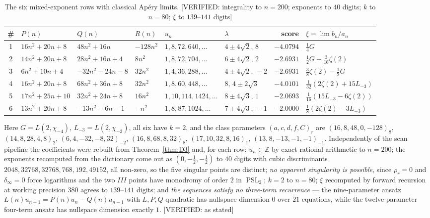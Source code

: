 \documentclass[11pt,reqno]{amsart}
\theoremstyle{plain}
\theoremstyle{definition}
\theoremstyle{remark}
\theoremstyle{plain}
\newcommand{\Z}{\mathbb{Z}}
\DeclareMathOperator{\PSL}{PSL}
\newcommand{\Verified}[1]{\textup{\textsf{[VERIFIED: #1]}}}
\begin{document}
\begin{table}[htbp]\centering\footnotesize
\setlength{\tabcolsep}{4pt}
\caption{The six mixed-exponent rows with classical Ap\'ery limits.
\Verified{integrality to $n=200$; exponents to $40$ digits; $k$ to $n=80$;
$\xi$ to $139$--$141$ digits}}\label{tab:six}
\begin{tabular}{clllllrl}
\toprule
\# & $P(n)$ & $Q(n)$ & $R(n)$ & $u_n$ & $\lambda$ & score & $\xi=\lim b_n/a_n$\\
\midrule
1 & $16n^2{+}20n{+}8$ & $48n^2{+}16n$ & $-128n^2$ & $1,8,72,640,\dots$ & $4{\pm}4\sqrt2,\,8$ & $-4.0794$ & $\tfrac14G$\\
2 & $14n^2{+}20n{+}8$ & $28n^2{+}16n{+}4$ & $8n^2$ & $1,8,72,704,\dots$ & $6{\pm}4\sqrt2,\,2$ & $-2.6931$ & $\tfrac12G-\tfrac3{16}\zeta(2)$\\
3 & $6n^2{+}10n{+}4$ & $-32n^2{-}24n{-}8$ & $32n^2$ & $1,4,36,288,\dots$ & $4{\pm}4\sqrt2,\,-2$ & $-2.6931$ & $\tfrac38\zeta(2)-\tfrac12G$\\
4 & $16n^2{+}20n{+}8$ & $68n^2{+}36n{+}8$ & $32n^2$ & $1,8,60,448,\dots$ & $8,\,4{\pm}2\sqrt3$ & $-4.0101$ & $\tfrac1{32}(2\zeta(2)+15L_{-3})$\\
5 & $17n^2{+}25n{+}10$ & $32n^2{+}24n{+}8$ & $16n^2$ & $1,10,114,1424,\dots$ & $8{\pm}4\sqrt3,\,1$ & $-2.0693$ & $\tfrac1{16}(15L_{-3}-6\zeta(2))$\\
6 & $13n^2{+}20n{+}8$ & $-13n^2{-}6n{-}1$ & $-n^2$ & $1,8,87,1024,\dots$ & $7{\pm}4\sqrt3,\,-1$ & $-2.0000$ & $\tfrac18(2\zeta(2)-3L_{-3})$\\
\bottomrule
\end{tabular}
\end{table}

Here $G=L(2,\chi_{-4})$, $L_{-3}=L(2,\chi_{-3})$, all six have $k=2$, and the
class parameters $(a,c,d,f,C)_r$ are $(16,8,48,0,-128)_{8}$,
$(14,8,28,4,8)_{2}$, $(6,4,-32,-8,32)_{-2}$, $(16,8,68,8,32)_{8}$,
$(17,10,32,8,16)_{1}$, $(13,8,-13,-1,-1)_{-1}$.
Independently of the scan pipeline the coefficients were rebuilt from
Theorem~\ref{thm:D3} and, for each row: $u_n\in\Z$ by exact rational arithmetic
to $n=200$; the exponents recomputed from the dictionary come out as
$(0,-\tfrac12,-\tfrac12)$ to $40$ digits with cubic discriminants
$2048,32768,32768,768,192,49152$, all non-zero, so the five singular points are
distinct; \emph{no apparent singularity is possible}, since $\rho_r=0$ and
$\delta_\infty=0$ force logarithms and the two $III$ points have monodromy of
order $2$ in $\PSL_2$; $k=2$ to $n=80$; $\xi$ recomputed by forward recursion at
working precision $380$ agrees to $139$--$141$ digits; and \emph{the sequences
satisfy no three-term recurrence} --- the nine-parameter ansatz
$L(n)u_{n+1}=P(n)u_n-Q(n)u_{n-1}$ with $L,P,Q$ quadratic has nullspace dimension
$0$ over $21$ equations, while the twelve-parameter four-term ansatz has
nullspace dimension exactly $1$. \Verified{as stated}
\end{document}
